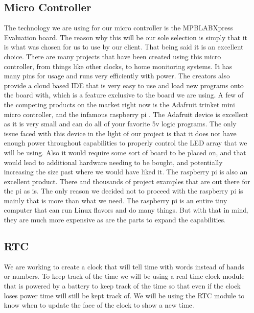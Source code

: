 \documentclass[onecolumn, draftclsnofoot,10pt, compsoc]{IEEEtran}
\begin{document}
\subsection{Micro Controller}
The technology we are using for our micro controller is the MPBLABXpress Evaluation board.
The reason why this will be our sole selection is simply that it is what was chosen for us to use by our client.
That being said it is an excellent choice.
There are many projects that have been created using this micro controller, from things like other clocks, to home monitoring systems.
It has many pins for usage and runs very efficiently with power. The creators also provide a cloud based IDE \cite{cloudIDE} that is very easy to use and load new programs onto the board with, which is a feature exclusive to the board we are using.
A few of the competing products on the market right now is the Adafruit trinket \cite{trinket} mini micro controller, and the infamous raspberry pi \cite{pi}.
The Adafruit device is excellent as it is very small and can do all of your favorite 5v logic programs.
The only issue faced with this device in the light of our project is that it does not have enough power throughout capabilities to properly control the LED array that we will be using.
Also it would require some sort of board to be placed on, and that would lead to additional hardware needing to be bought, and potentially increasing the size past where we would have liked it.
The raspberry pi is also an excellent product. There and thousands of project examples that are out there for the pi as is.
The only reason we decided not to proceed with the raspberry pi is mainly that is more than what we need.
The raspberry pi is an entire tiny computer that can run Linux flavors and do many things.
But with that in mind, they are much more expensive as are the parts to expand the capabilities.

\subsection{RTC}
We are working to create a clock that will tell time with words instead of hands or numbers.
To keep track of the time we will be using a real time clock module that is powered by a battery to keep track of the time so that even if the clock loses power time will still be kept track of.
We will be using the RTC module to know when to update the face of the clock to show a new time.
\end{document}

